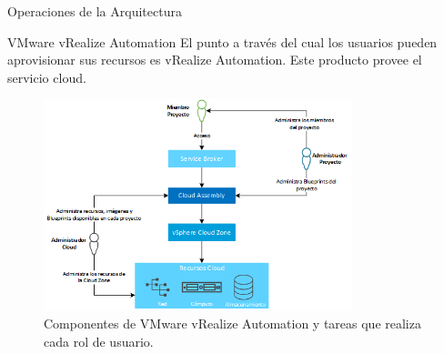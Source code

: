 \begin{subsection}{Operaciones de la Arquitectura}
    \begin{subsubsection}{VMware vRealize Automation}
        El punto a través del cual los usuarios pueden aprovisionar sus recursos es vRealize Automation. Este producto provee el servicio cloud. 
        \begin{figure}[h]
            \centering
            \includegraphics[width=0.8\textwidth]{imaxes/vRealize_pruebaconcepto/ComponentesVRA.png}
            \caption{Componentes de VMware vRealize Automation y tareas que realiza cada rol de usuario.}
            \label{fig:users-defined-AD}
        \end{figure}
        \FloatBarrier

\end{subsubsection}
\end{subsection}
